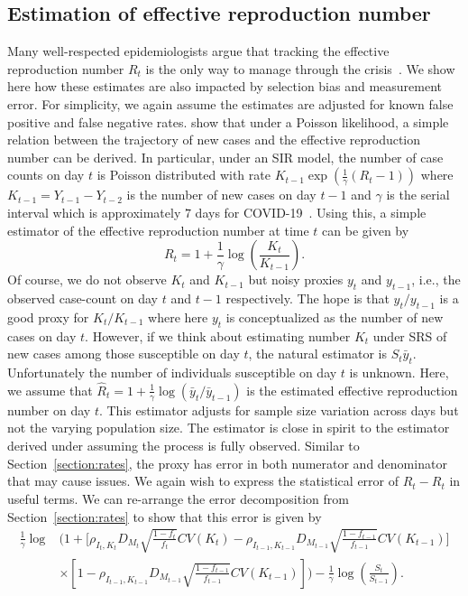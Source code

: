 \documentclass[12pt]{article}
\begin{document}
\subsection*{Estimation of effective reproduction number}
\label{section:r0-estimation}
Many well-respected epidemiologists argue that tracking the effective reproduction number $R_t$ is the only way to manage through the crisis~\cite{Gabriel2020}.  We show here how these estimates are also impacted by selection bias and measurement error.  For simplicity, we again assume the estimates are adjusted for known false positive and false negative rates. \cite{Bettencourt2008} show that under a Poisson likelihood, a simple relation between the trajectory of new cases and the effective reproduction number can be derived.  In particular, under an SIR model, the number of case counts on day $t$ is Poisson distributed with rate $K_{t-1} \exp \left( \frac{1}{\gamma} (R_t - 1) \right)$ where $K_{t-1} = Y_{t-1}-Y_{t-2}$ is the number of new cases on day $t-1$ and $\gamma$ is the serial interval which is approximately $7$ days for COVID-19~\cite{Sanche2020}.  Using this, a simple estimator of the effective reproduction number at time $t$ can be given by
$$
R_t = 1 + \frac{1}{\gamma} \log \left( \frac{K_t}{K_{t-1}} \right).
$$
Of course, we do not observe $K_t$ and $K_{t-1}$ but noisy proxies $y_t$ and $y_{t-1}$, i.e., the observed case-count on day $t$ and $t-1$ respectively. The hope is that $y_t/y_{t-1}$ is a good proxy for $K_t/K_{t-1}$ where here $y_t$ is conceptualized as the number of new cases on day $t$. However, if we think about estimating number $K_t$ under SRS of new cases among those susceptible on day $t$, the natural estimator is $S_t \bar y_t$.  Unfortunately the number of individuals susceptible on day $t$ is unknown.  Here, we assume that $\hat R_t = 1 + \frac{1}{\gamma} \log \left( \bar y_t / \bar y_{t-1} \right)$ is the estimated effective reproduction number on day $t$.
This estimator adjusts for sample size variation across days but not the varying population size. The estimator is close in spirit to the estimator derived under assuming the process is fully observed.  Similar to Section~\ref{section:rates}, the proxy has error in both numerator and denominator that may cause issues.  We again wish to express the statistical error of $\hat R_t - R_t$ in useful terms.  We can re-arrange the error decomposition from Section~\ref{section:rates} to show that this error is given by
$$
\begin{aligned}
\frac{1}{\gamma}\log &\bigg( 1 + \bigg[ \rho_{I_t,K_t} D_{M_t} \sqrt{\frac{1-f_t}{f_t}} CV (K_t)  -\rho_{I_{t-1},K_{t-1}} D_{M_{t-1}} \sqrt{\frac{1-f_{t-1}}{f_{t-1}}} CV (K_{t-1}) \bigg] \\
&\times \left[ 1 - \rho_{I_{t-1},K_{t-1}} D_{M_{t-1}} \sqrt{\frac{1-f_{t-1}}{f_{t-1}}} CV (K_{t-1}) \right] \bigg) - \frac{1}{\gamma} \log \left( \frac{S_t}{S_{t-1}} \right).
\end{aligned}
$$
\end{document}
